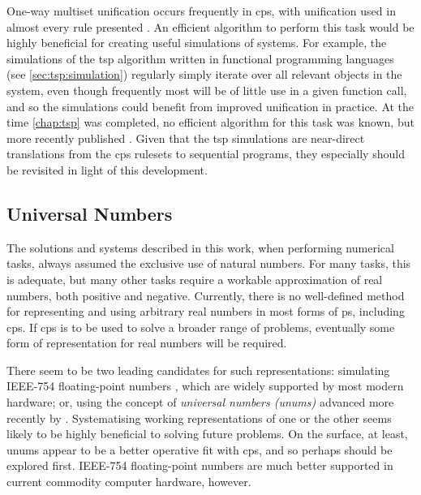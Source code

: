 One-way multiset unification occurs frequently in \gls{cps}, with unification used in almost every rule presented .  An efficient algorithm to perform this task would be highly beneficial for creating useful simulations of systems.  For example, the simulations of the \gls{tsp} algorithm written in functional programming languages (see \vref{sec:tsp:simulation}) regularly simply iterate over all relevant objects in the system, even though frequently most will be of little use in a given function call, and so the simulations could benefit from improved unification in practice.  At the time \cref{chap:tsp} was completed, no efficient algorithm for this task was known, but more recently \citeauthor{Liu2021} published  \cite{Liu2021}.  Given that the \gls{tsp} simulations are near-direct translations from the \gls{cps} \glspl{ruleset} to sequential programs, they especially should be revisited in light of this development.  %


\subsection{Universal Numbers}

The solutions and systems described in this work, when performing numerical tasks, always assumed the exclusive use of natural numbers.  For many tasks, this is adequate, but many other tasks require a workable approximation of real numbers, both positive and negative.  Currently, there is no well-defined method for representing and using arbitrary real numbers in most forms of \gls{ps}, including \gls{cps}.  If \gls{cps} is to be used to solve a broader range of problems, eventually some form of representation for real numbers will be required.

There seem to be two leading candidates for such representations:  simulating IEEE-754 floating-point numbers \cite{ieee754}, which are widely supported by most modern hardware;  or, using the concept of \emph{universal numbers (unums)} advanced more recently by \citeauthor{Gustafson2017} \cite{Gustafson2017}.  Systematising working representations of one or the other seems likely to be highly beneficial to solving future problems.  On the surface, at least, unums appear to be a better operative fit with \gls{cps}, and so perhaps should be explored first.  IEEE-754 floating-point numbers are much better supported in current commodity computer hardware, however.

